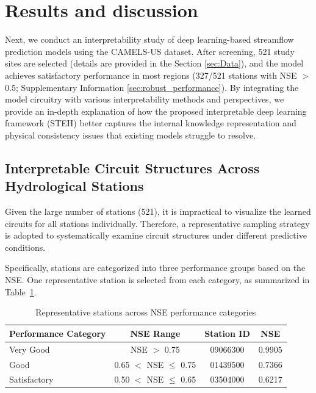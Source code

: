 \section{Results and discussion}
Next, we conduct an interpretability study of deep learning-based streamflow prediction models using the CAMELS-US dataset. After screening, 521 study sites are selected (details are provided in the Section \ref{sec:Data}), and the model achieves satisfactory performance in most regions (327/521 stations with NSE $>$ 0.5; Supplementary Information \ref{sec:robust_performance}). By integrating the model circuitry with various interpretability methods and perspectives, we provide an in-depth explanation of how the proposed interpretable deep learning framework (STEH) better captures the internal knowledge representation and physical consistency issues that existing models struggle to resolve.

\subsection{Interpretable Circuit Structures Across Hydrological Stations}
Given the large number of stations (521), it is impractical to visualize the learned circuits for all stations individually. Therefore, a representative sampling strategy is adopted to systematically examine circuit structures under different predictive conditions.

Specifically, stations are categorized into three performance groups\cite{Nse} based on the NSE. One representative station is selected from each category, as summarized in Table~\ref{tab:nse_categories}.

\begin{table}[htbp]
    \centering
    \caption{Representative stations across NSE performance categories}
    \label{tab:nse_categories}
    \begin{tabular*}{\textwidth}{@{\extracolsep{\fill}}lccc}
        \toprule
        Performance Category & NSE Range & Station ID & NSE \\
        \midrule
        Very Good     & NSE $>$ 0.75              & 09066300 & 0.9905 \\
        Good          & 0.65 $<$ NSE $\leq$ 0.75 & 01439500 & 0.7366 \\
        Satisfactory  & 0.50 $<$ NSE $\leq$ 0.65 & 03504000 & 0.6217 \\
        \bottomrule
    \end{tabular*}
\end{table}

